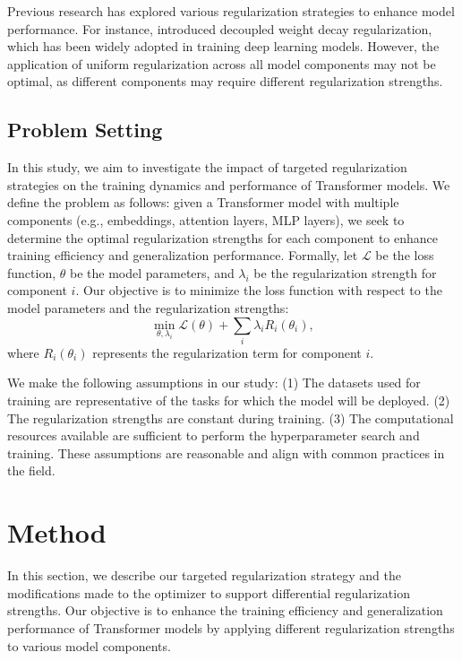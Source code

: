\documentclass{article} %
\begin{document}
Previous research has explored various regularization strategies to enhance model performance. For instance, \citet{loshchilov2017adamw} introduced decoupled weight decay regularization, which has been widely adopted in training deep learning models. However, the application of uniform regularization across all model components may not be optimal, as different components may require different regularization strengths.

\subsection{Problem Setting}
In this study, we aim to investigate the impact of targeted regularization strategies on the training dynamics and performance of Transformer models. We define the problem as follows: given a Transformer model with multiple components (e.g., embeddings, attention layers, MLP layers), we seek to determine the optimal regularization strengths for each component to enhance training efficiency and generalization performance. Formally, let $\mathcal{L}$ be the loss function, $\theta$ be the model parameters, and $\lambda_i$ be the regularization strength for component $i$. Our objective is to minimize the loss function with respect to the model parameters and the regularization strengths:
\begin{equation}
\min_{\theta, \lambda_i} \mathcal{L}(\theta) + \sum_{i} \lambda_i R_i(\theta_i),
\end{equation}
where $R_i(\theta_i)$ represents the regularization term for component $i$.

We make the following assumptions in our study: (1) The datasets used for training are representative of the tasks for which the model will be deployed. (2) The regularization strengths are constant during training. (3) The computational resources available are sufficient to perform the hyperparameter search and training. These assumptions are reasonable and align with common practices in the field.

\section{Method}
\label{sec:method}

In this section, we describe our targeted regularization strategy and the modifications made to the optimizer to support differential regularization strengths. Our objective is to enhance the training efficiency and generalization performance of Transformer models by applying different regularization strengths to various model components.
\end{document}

